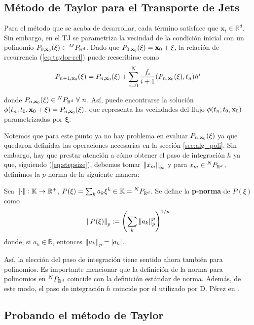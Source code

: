 \subsection{Método de Taylor para el Transporte de Jets}
Para el método que se acaba de desarrollar, cada término satisface que $\mathbf{x}_i \in \mathbb{R}^d$. Sin embargo, en el TJ se parametriza la vecindad de la condición inicial con un polinomio $P_{0,\mathbf{x}_0}(\mathbf{\xi}) \in {^{M}P_{\mathbb{R}^ d} }$. Dado que $P_{0,\mathbf{x}_0}(\mathbf{\xi}) = \mathbf{x}_0 + \mathbf{\xi}$, la relación de recurrencia (\ref{eq:taylor-rel}) puede reescribirse como
\begin{equation}
P_{n+1,\mathbf{x}_0}(\xi) = P_{n,\mathbf{x}_0}(\xi) + \sum_{i=0}^N \frac{f_i}{i+1}(P_{n,\mathbf{x}_0}(\xi),t_n)h^i 
\label{eq:jt-rel}
\end{equation}

donde $P_{n,\xo}(\xi) \in \pkk{N}{d} \ \forall \ n$. Así, puede encontrarse la solución $\phi(t_n;t_0,\mathbf{x}_0 + \mathbf{\xi}) = P_{n,\mathbf{x}_0}(\xi)$, que representa las vecindades del flujo $\phi(t_n;t_0,\mathbf{x}_0)$ parametrizadas por $\mathbf{\xi}$.

Notemos que para este punto ya no hay problema en evaluar $P_{n,\mathbf{x}_0}(\xi)$ ya que quedaron definidas las operaciones necesarias en la sección \ref{sec:alg_poli}. Sin embargo, hay que prestar atención a cómo obtener el paso de integración $h$ ya que, siguiendo (\ref{eq:stepsize}), debemos tomar $\left\lVert x_m\right\rVert_\infty$ y para $x_m \in {^{N}P_{\mathbb{R}^ d} }$, definimos la $p$-norma de la siguiente manera:

\begin{definicion}
Sea $\left\lVert\cdot\right\rVert : \mathbb{K} \to \mathbb{R}^+$, $P(\mathbf{\xi}) = \sum_{k} a_k \mathbf{\xi}^k \in \mathbb{K} = {^{N}P_{\mathbb{R}^ d} }$. Se define la \textbf{p-norma} de $P(\xi)$ como
\begin{equation}
 \left\lVert P(\mathbf{\xi})\right\rVert_p := \left( \sum_{k} \left\lVert a_k\right\rVert_p^p \right)^{1/p}
 \label{eq:poly-norm}
\end{equation}  
donde, si $a_k \in \mathbb{R}$, entonces $\left\lVert a_k\right\rVert_p = |a_k|$.
\end{definicion}

Así, la elección del paso de integración tiene sentido ahora también para polinomios. Es importante mencionar que la definición de la norma para polinomios en ${^{N}P_{\mathbb{R}^ d} }$ coincide con la definición estándar de norma. Además, de este modo, el paso de integración $h$ coincide por el utilizado por D. Pérez en \cite{Daniel2015}.

\subsection{Probando el método de Taylor}
\label{sec:benchmark-taylor}

